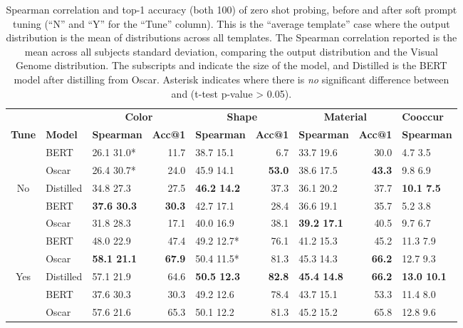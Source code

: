 \documentclass[11pt]{article}
\begin{document}
\begin{table*}[ht]
\small
\centering
\begin{tabular}{cl|lr|lr|lr|l}
\hline
 & & \multicolumn{2}{c|}{\textbf{Color}} & \multicolumn{2}{c|}{\textbf{Shape}} & \multicolumn{2}{c|}{\textbf{Material}} & \textbf{Cooccur}\\
\cmidrule(lr){3-4}\cmidrule(lr){5-6}\cmidrule(lr){7-8}\cmidrule(lr){9-9}
\textbf{Tune} & \textbf{Model} & \textbf{Spearman } & \textbf{Acc@1} & \textbf{Spearman } & \textbf{Acc@1} & \textbf{Spearman } & \textbf{Acc@1} & \textbf{Spearman }\\
\hline
 & BERT & 26.1  31.0* & 11.7 & 38.7  15.1 & 6.7 & 33.7  19.6 & 30.0 & 4.7  3.5\\
 & Oscar & 26.4  30.7* & 24.0 & 45.9  14.1 & \textbf{53.0} & 38.6  17.5 & \textbf{43.3} & 9.8  6.9\\
 No & Distilled & 34.8  27.3 & 27.5 & \textbf{46.2  14.2} & 37.3 & 36.1  20.2 & 37.7 & \textbf{10.1  7.5}\\
 & BERT & \textbf{37.6  30.3} & \textbf{30.3} & 42.7  17.1 & 28.4 & 36.6  19.1 & 35.7 & 5.2  3.8\\
 & Oscar & 31.8  28.3 & 17.1 & 40.0  16.9 & 38.1 & \textbf{39.2  17.1} & 40.5 & 9.7  6.7\\
\hline
 & BERT & 48.0  22.9 & 47.4 & 49.2  12.7* & 76.1 & 41.2  15.3 & 45.2 & 11.3  7.9\\
 & Oscar & \textbf{58.1  21.1} & \textbf{67.9} & 50.4  11.5* & 81.3 & 45.3  14.3 & \textbf{66.2} & 12.7  9.3\\
Yes & Distilled & 57.1  21.9 & 64.6 & \textbf{50.5  12.3} & \textbf{82.8} & \textbf{45.4  14.8} & \textbf{66.2} & \textbf{13.0  10.1}\\
 & BERT & 37.6  30.3 & 30.3 & 49.2  12.6 & 78.4 & 43.7  15.1 & 53.3 & 11.4  8.0\\
 & Oscar & 57.6  21.6 & 65.3 & 50.1  12.2 & 81.3 & 45.2  15.2 & 65.8 & 12.8  9.6\\
\hline
\end{tabular}
\caption{\label{zero_shot_avg_all}
Spearman correlation and top-1 accuracy (both  100) of zero shot probing, before and after soft prompt tuning (``N'' and ``Y'' for the ``Tune'' column). This is the ``average template'' case where the output distribution is the mean of distributions across all templates. The Spearman correlation reported is the mean across all subjects  standard deviation, comparing the output distribution and the Visual Genome distribution. The subscripts  and  indicate the size of the model, and Distilled is the BERT model after distilling from Oscar. Asterisk indicates where there is \emph{no} significant difference between  and  (t-test p-value > 0.05).}
\vspace{-1em}
\end{table*}
\end{document}
